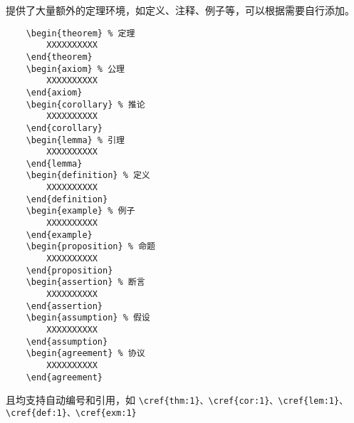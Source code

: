 提供了大量额外的定理环境，如定义、注释、例子等，可以根据需要自行添加。
\begin{verbatim}
    \begin{theorem} % 定理
        XXXXXXXXXX
    \end{theorem}
    \begin{axiom} % 公理
        XXXXXXXXXX
    \end{axiom}
    \begin{corollary} % 推论
        XXXXXXXXXX
    \end{corollary}
    \begin{lemma} % 引理
        XXXXXXXXXX
    \end{lemma}
    \begin{definition} % 定义
        XXXXXXXXXX
    \end{definition}
    \begin{example} % 例子
        XXXXXXXXXX
    \end{example}
    \begin{proposition} % 命题
        XXXXXXXXXX
    \end{proposition}
    \begin{assertion} % 断言
        XXXXXXXXXX
    \end{assertion}
    \begin{assumption} % 假设
        XXXXXXXXXX
    \end{assumption}
    \begin{agreement} % 协议
        XXXXXXXXXX
    \end{agreement}
\end{verbatim}

且均支持自动编号和引用，如 \verb|\cref{thm:1}、\cref{cor:1}、\cref{lem:1}、\cref{def:1}、\cref{exm:1}|


